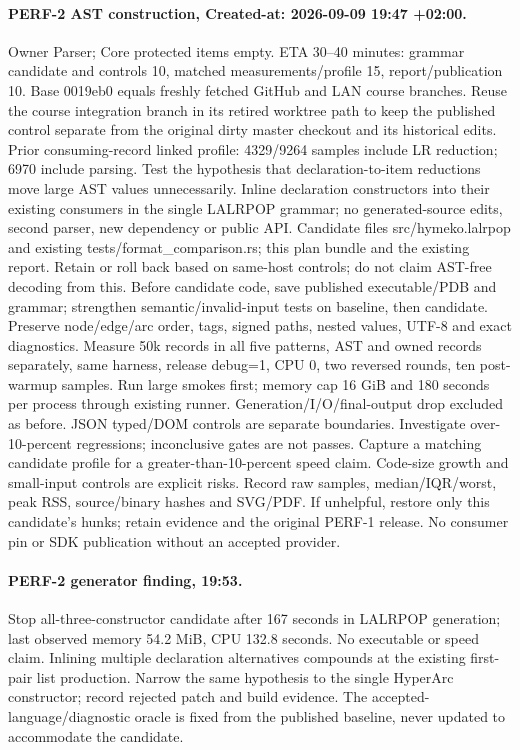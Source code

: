 \documentclass[11pt,a4paper]{article}
\begin{document}
\paragraph{PERF-2 AST construction, Created-at: 2026-09-09 19:47 +02:00.}
Owner Parser; Core protected items empty. ETA 30--40 minutes: grammar candidate
and controls 10, matched measurements/profile 15, report/publication 10.
Base 0019eb0 equals freshly fetched GitHub and LAN course branches. Reuse the
course integration branch in its retired worktree path to keep the published
control separate from the original dirty master checkout and its historical edits.
Prior consuming-record linked profile: 4329/9264 samples include LR reduction;
6970 include parsing. Test the hypothesis that declaration-to-item reductions move
large AST values unnecessarily. Inline declaration constructors into their existing
consumers in the single LALRPOP grammar; no generated-source edits, second parser,
new dependency or public API. Candidate files src/hymeko.lalrpop and existing
 tests/format\_comparison.rs; this plan bundle and the existing report. Retain or
roll back based on same-host controls; do not claim AST-free decoding from this.
Before candidate code, save published executable/PDB and grammar; strengthen
semantic/invalid-input tests on baseline, then candidate. Preserve node/edge/arc
order, tags, signed paths, nested values, UTF-8 and exact diagnostics. Measure
50k records in all five patterns, AST and owned records separately, same harness,
release debug=1, CPU 0, two reversed rounds, ten post-warmup samples. Run large
smokes first; memory cap 16 GiB and 180 seconds per process through existing runner.
Generation/I/O/final-output drop excluded as before. JSON typed/DOM controls are
separate boundaries. Investigate over-10-percent regressions; inconclusive gates
are not passes. Capture a matching candidate profile for a greater-than-10-percent
speed claim. Code-size growth and small-input controls are explicit risks.
Record raw samples, median/IQR/worst, peak RSS, source/binary hashes and SVG/PDF.
If unhelpful, restore only this candidate's hunks; retain evidence and the original
PERF-1 release. No consumer pin or SDK publication without an accepted provider.
\paragraph{PERF-2 generator finding, 19:53.}
Stop all-three-constructor candidate after 167 seconds in LALRPOP generation;
last observed memory 54.2 MiB, CPU 132.8 seconds. No executable or speed claim.
Inlining multiple declaration alternatives compounds at the existing first-pair
list production. Narrow the same hypothesis to the single HyperArc constructor;
record rejected patch and build evidence. The accepted-language/diagnostic oracle
is fixed from the published baseline, never updated to accommodate the candidate.
\end{document}
